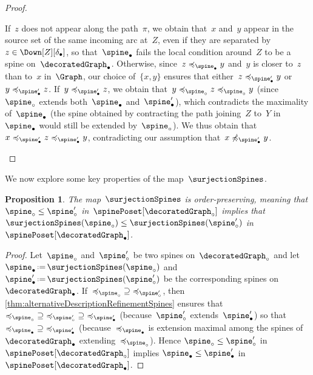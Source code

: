 \documentclass{amsart}
\newtheorem{proposition}[theorem]{Proposition}
\theoremstyle{definition}
\newcommand{\eqdef}{\mbox{\,\raisebox{0.2ex}{\scriptsize\ensuremath{\mathrm:}}\ensuremath{=}\,}} %
\newcommand{\decoration}{\delta}
\begin{document}
\begin{proof}
\begin{enumerate}[(i)]
    If~$z$ does not appear along the path~$\pi$, we obtain that~$x$ and~$y$ appear in the source set of the same incoming arc at~$Z$, even if they are separated by~$z \in \Down[Z][\decoration_\bullet]$, so that~$\spine_\bullet$ fails the local condition around~$Z$ to be a spine on~$\decoratedGraph_\bullet$.
    Otherwise, since~$z \preccurlyeq_{\spine_\bullet} y$ and~$y$ is closer to~$z$ than to~$x$ in~$\Graph$, our choice of~$\{x,y\}$ ensures that either~$z \preccurlyeq_{\spine_\bullet'} y$ or~$y \preccurlyeq_{\spine_\bullet'} z$.
    If~$y \preccurlyeq_{\spine_\bullet'} z$, we obtain that~$y \preccurlyeq_{\spine_\circ} z \preccurlyeq_{\spine_\circ} y$ (since~$\spine_\circ$ extends both~$\spine_\bullet$ and~$\spine_\bullet'$), which contradicts the maximality of~$\spine_\bullet$ (the spine obtained by contracting the path joining~$Z$ to~$Y$ in~$\spine_\bullet$ would still be extended by~$\spine_\circ$).
    We thus obtain that~$x \preccurlyeq_{\spine_\bullet'} z \preccurlyeq_{\spine_\bullet'} y$, contradicting our assumption that~$x \not\preccurlyeq_{\spine_\bullet'} y$.
    \qedhere
  \end{enumerate}
\end{proof}

We now explore some key properties of the map~$\surjectionSpines$.

\begin{proposition}
  \label{prop:orderPreservingRefinementSpines}
  The map~$\surjectionSpines$ is order-preserving, meaning that $\spine_\circ \le \spine_\circ'$ in~$\spinePoset[\decoratedGraph_\circ]$ implies that $\surjectionSpines(\spine_\circ) \le \surjectionSpines(\spine_\circ')$ in~$\spinePoset[\decoratedGraph_\bullet]$.
\end{proposition}

\begin{proof}
  Let~$\spine_\circ$ and~$\spine_\circ'$ be two spines on~$\decoratedGraph_\circ$ and let~$\spine_\bullet \eqdef \surjectionSpines(\spine_\circ)$ and~$\spine_\bullet' \eqdef \surjectionSpines(\spine_\circ')$ be the corresponding spines on~$\decoratedGraph_\bullet$.
  If~${\preccurlyeq_{\spine_\circ}} \supseteq {\preccurlyeq_{\spine_\circ'}}$, then \cref{thm:alternativeDescriptionRefinementSpines} ensures that~${\preccurlyeq_{\spine_\circ}} \supseteq {\preccurlyeq_{\spine_\circ'}} \supseteq {\preccurlyeq_{\spine_\bullet'}}$ (because~$\spine_\circ'$ extends~$\spine_\bullet'$) so that~${\preccurlyeq_{\spine_\bullet}} \supseteq {\preccurlyeq_{\spine_\bullet'}}$ (because~$\preccurlyeq_{\spine_\bullet}$ is extension maximal among the spines of~$\decoratedGraph_\bullet$ extending~$\preccurlyeq_{\spine_\circ}$).
  Hence $\spine_\circ \le \spine_\circ'$  in~$\spinePoset[\decoratedGraph_\circ]$ implies $\spine_\bullet \le \spine_\bullet'$ in~$\spinePoset[\decoratedGraph_\bullet]$.
\end{proof}
\end{document}
